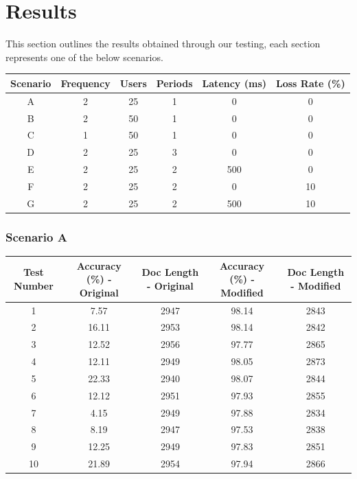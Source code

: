 \documentclass[9pt, titlepage]{article}
\begin{document}
  \section*{Results}
  This section outlines the results obtained through our testing, each section represents one of the below scenarios.
  \begin{center}
    \centering
    \begin{tabular}{||c c c c c c||} 
      \hline
      Scenario & Frequency & Users & Periods & Latency (ms) & Loss Rate (\%)\\ [0.5ex]
      \hline\hline
      A & 2 & 25 & 1 & 0 & 0\\ 
      \hline
      B & 2 & 50 & 1 & 0 & 0\\
      \hline
      C & 1 & 50 & 1 & 0 & 0\\
      \hline
      D & 2 & 25 & 3 & 0 & 0\\
      \hline
      E & 2 & 25 & 2 & 500 & 0\\
      \hline
      F & 2 & 25 & 2 & 0 & 10\\
      \hline
      G & 2 & 25 & 2 & 500 & 10\\
      \hline
    \end{tabular}
  \end{center}

  \subsubsection{Scenario A}
  
  \begin{center}
    \begin{tabular}{||c c c c c||} 
      \hline
      Test Number & Accuracy (\%) - Original & Doc Length - Original & Accuracy (\%) - Modified & Doc Length - Modified \\ [0.5ex] 
      \hline\hline
      1 &  7.57 & 2947 & 98.14 & 2843 \\ 
      \hline
      2 & 16.11 & 2953 & 98.14 & 2842 \\ 
      \hline
      3 & 12.52 & 2956 & 97.77 & 2865 \\ 
      \hline
      4 & 12.11 & 2949 & 98.05 & 2873 \\ 
      \hline
      5 & 22.33 & 2940 & 98.07 & 2844 \\ 
      \hline
      6 & 12.12 & 2951 & 97.93 & 2855 \\ 
      \hline
      7 & 4.15 & 2949 & 97.88 & 2834 \\ 
      \hline
      8 & 8.19 & 2947 & 97.53 & 2838 \\ 
      \hline
      9 & 12.25 & 2949 & 97.83 & 2851 \\ 
      \hline
      10 & 21.89 & 2954 & 97.94 & 2866 \\ 
      \hline
    \end{tabular}
  \end{center}
  
\end{document}
